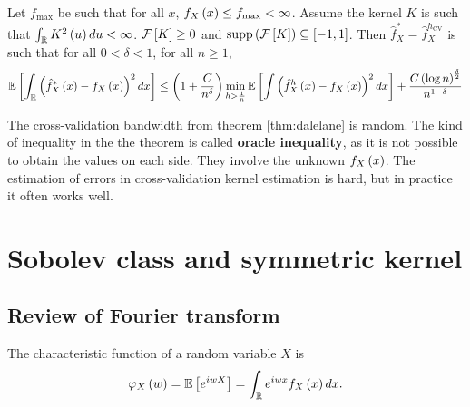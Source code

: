 \begin{theorem}
	\label{thm:dalelane}
	Let $f_{\max}$ be such that for all $x$, $f_X\left(x\right)\leq f_{\max} <\infty$. Assume the kernel $K$ is such that
	$\int_{\mathbb{R}} K^2\left(u\right)du<\infty$. $\mathcal{F}\left[K\right]\geq 0$ and $\mathrm{supp}\left(\mathcal{F}\left[K\right]\right)\subseteq [-1,1]$. Then $\hat{f}_X^\ast = \hat{f}_X^{h_{\mathrm{CV}}}$ is such that for all $0<\delta <1$, for all $n\geq 1$,
	\begin{equation*}
		\mathbb{E}\left[\int_{\mathbb{R}} \left(\hat{f}^\ast_X \left(x\right) - f_X\left(x\right)\right)^2dx\right] \leq \left(1+\frac{C}{n^\delta}\right) \min_{h>\frac{1}{n}} \mathbb{E}\left[\int \left(\hat{f}_X^h\left(x\right) - f_X\left(x\right)\right)^2 dx\right] + \frac{C\left(\log n\right)^{\frac{\delta}{2}}}{n^{1-\delta}}
	\end{equation*}
\end{theorem}
\begin{remark}
	The cross-validation bandwidth from theorem \ref{thm:dalelane} is random. The kind of inequality in the the theorem is called \textbf{oracle inequality}, as it is not possible to obtain the values on each side. They involve the unknown $f_X\left(x\right)$. The estimation of errors in cross-validation kernel estimation is hard, but in practice it often works well.
\end{remark}

\section{Sobolev class and symmetric kernel}
\subsection{Review of Fourier transform}
\begin{definition}
	The characteristic function of a random variable $X$ is
	\begin{equation*}
		\varphi_X\left(w\right) = \mathbb{E}\left[e^{iwX}\right] = \int_{\mathbb{R}} e^{iwx} f_X\left(x\right)dx.
	\end{equation*}
\end{definition}

